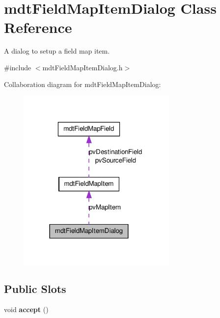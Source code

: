 \hypertarget{classmdt_field_map_item_dialog}{
\section{mdtFieldMapItemDialog Class Reference}
\label{classmdt_field_map_item_dialog}
}


A dialog to setup a field map item.  




{\ttfamily \#include $<$mdtFieldMapItemDialog.h$>$}



Collaboration diagram for mdtFieldMapItemDialog:\nopagebreak
\begin{figure}[H]
\begin{center}
\leavevmode
\includegraphics[width=222pt]{classmdt_field_map_item_dialog__coll__graph}
\end{center}
\end{figure}
\subsection*{Public Slots}
\begin{DoxyCompactItemize}
\item 
\hypertarget{classmdt_field_map_item_dialog_a43b775a21d170f8d801f7c493cfdcdcc}{
void {\bfseries accept} ()}
\label{classmdt_field_map_item_dialog_a43b775a21d170f8d801f7c493cfdcdcc}

\end{DoxyCompactItemize}
